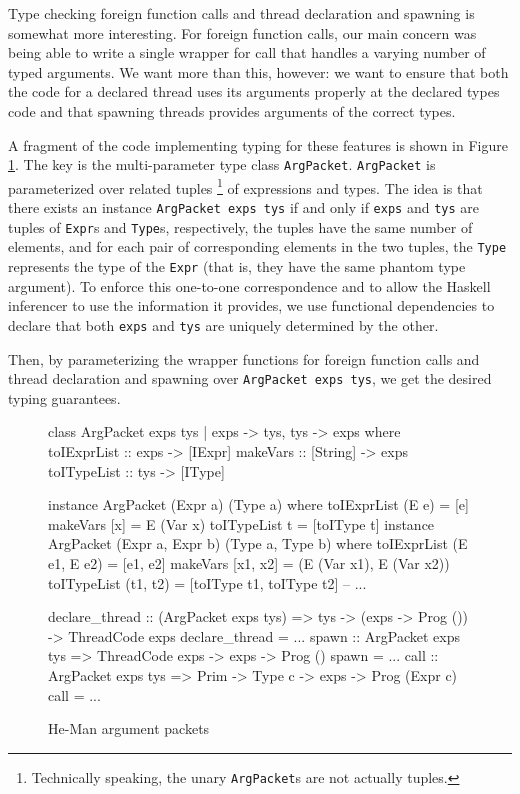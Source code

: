 \documentclass[preprint]{sigplanconf}
\renewcommand{\t}{\texttt}
\begin{document}
Type checking foreign function calls and thread declaration and
spawning is somewhat more interesting.  For foreign function calls,
our main concern was being able to write a single wrapper for call
that handles a varying number of typed arguments. We want more than
this, however: we want to ensure that both the code for a declared
thread uses its arguments properly at the declared types code and that
spawning threads provides arguments of the correct types.

A fragment of the code implementing typing for these features is shown
in Figure \ref{fig:arg-packets}. The key is the multi-parameter type
class \t{ArgPacket}. \t{ArgPacket} is parameterized over related
tuples \footnote{Technically speaking, the unary \t{ArgPacket}s are
  not actually tuples.} of expressions and types. The idea is that
there exists an instance \t{ArgPacket exps tys} if and only if
\t{exps} and \t{tys} are tuples of \t{Expr}s and \t{Type}s,
respectively, the tuples have the same number of elements, and for
each pair of corresponding elements in the two tuples, the \t{Type}
represents the type of the \t{Expr} (that is, they have the same
phantom type argument). To enforce this one-to-one correspondence and
to allow the Haskell inferencer to use the information it provides, we
use functional dependencies %
to declare that both \t{exps} and \t{tys} are uniquely determined by
the other.

Then, by parameterizing the wrapper functions for foreign function
calls and thread declaration and spawning over \t{ArgPacket exps tys},
we get the desired typing guarantees.

\begin{figure}[ht]
\centering
\begin{code}
class ArgPacket exps tys | exps -> tys,
                           tys -> exps where
  toIExprList :: exps -> [IExpr]
  makeVars :: [String] -> exps
  toITypeList :: tys -> [IType]

instance ArgPacket (Expr a) (Type a) where
  toIExprList (E e) = [e]
  makeVars [x] = E (Var x)
  toITypeList t = [toIType t]
instance ArgPacket (Expr a, Expr b) (Type a, Type b) where
  toIExprList (E e1, E e2) = [e1, e2]
  makeVars [x1, x2] = (E (Var x1), E (Var x2))
  toITypeList (t1, t2) = [toIType t1, toIType t2]
-- ...

declare_thread :: (ArgPacket exps tys) =>
                  tys -> (exps -> Prog ()) ->
                  ThreadCode exps
declare_thread = ...
spawn :: ArgPacket exps tys =>
         ThreadCode exps -> exps ->
         Prog ()
spawn = ...
call :: ArgPacket exps tys =>
        Prim -> Type c -> exps ->
        Prog (Expr c)
call = ...

\end{code}
\caption{He-Man argument packets} %
\label{fig:arg-packets}
\end{figure}
\end{document}
